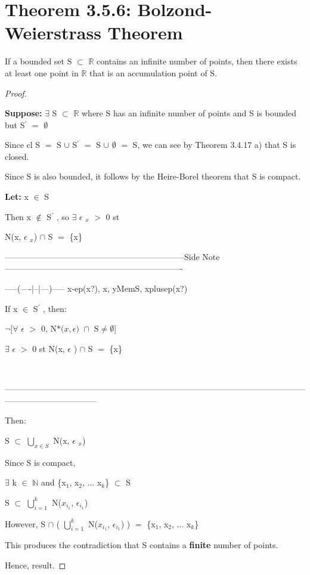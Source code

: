 \documentclass{article}
\newcommand{\mt}[1]{\ensuremath{#1}}
\newcommand\bsc[2][\DefaultOpt]{%
  \def\DefaultOpt{#2}%
  \section[#1]{#2}%
}
\newcommand{\bgpf}{\begin{proof} $ $\newline}
\newcommand{\lt}[1]{\textbf{Let: } #1}
\newcommand{\supp}[1]{\textbf{Suppose: } #1}
\newcommand{\epf}{\end{proof}}
\newcommand{\dbs}[3]{\mt{#1_{#2_#3}}}
\newcommand{\sidenote}[1]{-----------------------------------------------------------------Side Note----------------------------------------------------------------
#1 \

---------------------------------------------------------------------------------------------------------------------------------------------}
\newcommand{\br}{\mt{\mathbb{R}} }       %
\newcommand{\bn}{\mt{\mathbb{N}} }       %
\newcommand{\ep}{\mt{\epsilon} }         %
\newcommand{\fa}{\mt{\forall} }          %
\newcommand{\mem}{\mt{\in} }
\newcommand{\exs}{\mt{\exists} }
\newcommand{\es}{\mt{\emptyset} }        %
\newcommand{\sbs}{\mt{\subset} }         %
\newcommand{\eql}{\mt{=} }
\newcommand{\pr}{\mt{^\prime} } 		   %
\newcommand{\uw}[2]{#1\mt{_{#2}}}
\newcommand{\urng}[2]{\mt{\bigcup_{#1}^{#2}}}
\newcommand{\dnbho}[3]{\textrm{N*(}#1, #2\textrm{) }\cap \textrm{ #3} \neq \emptyset}
\begin{document}
\bsc{Theorem 3.5.6: Bolzond-Weierstrass Theorem}{

If a bounded set S \sbs \br contains an infinite number of points, then there exists at least one point in \br that is an accumulation point of S.

\bgpf

\supp{\exs S \sbs \br where S has an infinite number of points and S is bounded but S\pr \eql \es}

Since cl S \eql S $\cup$ S\pr \eql S $\cup$ \es \eql S, we can see by Theorem 3.4.17 a) that S is closed. \ 

Since S is also bounded, it follows by the Heire-Borel theorem that S is compact.

\lt{x \mem S}

Then x $\not\in$ S\pr, so \exs \uw{\ep}{x} $>$ 0 st 

N(x, \uw{\ep}{x}) $\cap$ S \eql \{x\}

\sidenote{
-----(----|--|---)-----
x-ep(x?), x, yMemS, xplusep(x?)

If x \mem S\pr, then:

$\neg$[\fa \ep $>$ 0, $\dnbho{x}{\ep}{S}$]

\exs \ep $>$ 0 st N(x, \ep) $\cap$ S \eql \{x\}

}

Then: 

S \sbs \urng{x \mem S}{} N(x, \uw{\ep}{x})

Since S is compact,

\exs k \mem \bn and \{\uw{x}{1}, \uw{x}{2}, ... \uw{x}{k}\} \sbs S

S \sbs \urng{i=1}{k} N(\dbs{x}{i}{1}, \dbs{\ep}{i}{1})

However, S $\cap$ ( \urng{i=1}{k} N(\dbs{x}{i}{1}, \dbs{\ep}{i}{1}) ) \eql \{\uw{x}{1}, \uw{x}{2}, ... \uw{x}{k}\}

This produces the contradiction that S contains a \textbf{finite} number of points.

Hence, result.

\epf

}
\end{document}
